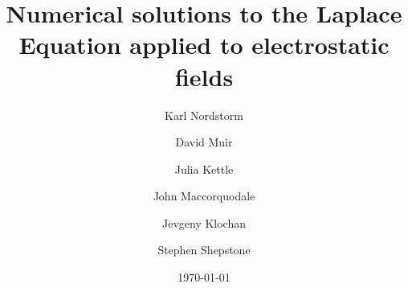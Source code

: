 \documentclass[aps,twocolumn,pre,nofootinbib]{revtex4-1}
\begin{document}

\newcommand{\breite}{1.0} %


\newtheorem{prop}{Proposition}
\newtheorem{cor}{Corollary}

\newcommand{\be}{\begin{equation}}
\newcommand{\ee}{\end{equation}}

\newcommand{\bea}{\begin{eqnarray}}
\newcommand{\eea}{\end{eqnarray}}

\newcommand{\Reals}{\mathbb{R}}     %
\newcommand{\Int}{\mathbb{Z}}       %
\newcommand{\Com}{\mathbb{C}}       %
\newcommand{\Nat}{\mathbb{N}}       %


\newcommand{\id}{\mathbbm{1}}    

\newcommand{\Real}{\mathop{\mathrm{Re}}}
\newcommand{\Imag}{\mathop{\mathrm{Im}}}

\def\O{\mbox{$\mathcal{O}$}}    
\def\F{\mathcal{F}}			
\def\sgn{\text{sgn}}

\newcommand{\dw}{\ensuremath{\Delta}} %
\newcommand{\wbp}{\ensuremath{\omega_0}}
\newcommand{\dv}{\ensuremath{\delta}}
\newcommand{\vbp}{\ensuremath{\nu_0}}
\newcommand{\vplus}{\ensuremath{\nu_{+}}}
\newcommand{\vminus}{\ensuremath{\nu_{-}}}
\newcommand{\wplus}{\ensuremath{\omega_{+}}}
\newcommand{\wminus}{\ensuremath{\omega_{-}}}



\title{Numerical solutions to the Laplace Equation applied to electrostatic fields}


\author{Karl Nordstorm}

\author{David Muir}

\author{Julia Kettle}

\author{John Maccorquodale}

\author{Jevgeny Klochan}

\author{Stephen Shepstone }



\date{\today}
\end{document}
